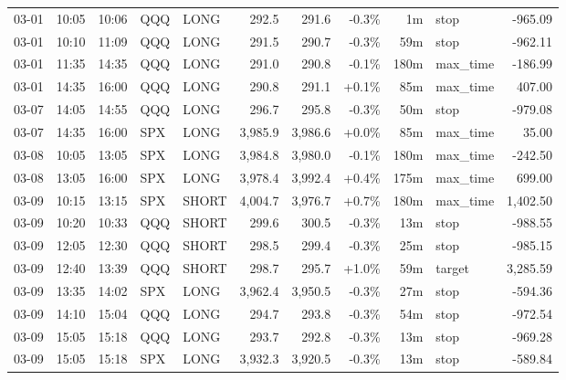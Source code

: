 \documentclass[11pt,a4paper,twoside]{article}
\begin{document}
\begin{center}
\begin{longtable}{>{\color{txtmain}}l l l l l r r r r >{\color{txtmain}}l r}
03-01 & 10:05 & 10:06 & QQQ & LONG & 292.5 & 291.6 & \textcolor{lossred}{-0.3\%} & 1m & stop & \textcolor{lossred}{-965.09} \\
03-01 & 10:10 & 11:09 & QQQ & LONG & 291.5 & 290.7 & \textcolor{lossred}{-0.3\%} & 59m & stop & \textcolor{lossred}{-962.11} \\
03-01 & 11:35 & 14:35 & QQQ & LONG & 291.0 & 290.8 & \textcolor{lossred}{-0.1\%} & 180m & max\_time & \textcolor{lossred}{-186.99} \\
03-01 & 14:35 & 16:00 & QQQ & LONG & 290.8 & 291.1 & \textcolor{wingreen}{+0.1\%} & 85m & max\_time & \textcolor{wingreen}{407.00} \\
03-07 & 14:05 & 14:55 & QQQ & LONG & 296.7 & 295.8 & \textcolor{lossred}{-0.3\%} & 50m & stop & \textcolor{lossred}{-979.08} \\
03-07 & 14:35 & 16:00 & SPX & LONG & 3,985.9 & 3,986.6 & \textcolor{wingreen}{+0.0\%} & 85m & max\_time & \textcolor{wingreen}{35.00} \\
03-08 & 10:05 & 13:05 & SPX & LONG & 3,984.8 & 3,980.0 & \textcolor{lossred}{-0.1\%} & 180m & max\_time & \textcolor{lossred}{-242.50} \\
03-08 & 13:05 & 16:00 & SPX & LONG & 3,978.4 & 3,992.4 & \textcolor{wingreen}{+0.4\%} & 175m & max\_time & \textcolor{wingreen}{699.00} \\
03-09 & 10:15 & 13:15 & SPX & SHORT & 4,004.7 & 3,976.7 & \textcolor{wingreen}{+0.7\%} & 180m & max\_time & \textcolor{wingreen}{1,402.50} \\
03-09 & 10:20 & 10:33 & QQQ & SHORT & 299.6 & 300.5 & \textcolor{lossred}{-0.3\%} & 13m & stop & \textcolor{lossred}{-988.55} \\
03-09 & 12:05 & 12:30 & QQQ & SHORT & 298.5 & 299.4 & \textcolor{lossred}{-0.3\%} & 25m & stop & \textcolor{lossred}{-985.15} \\
03-09 & 12:40 & 13:39 & QQQ & SHORT & 298.7 & 295.7 & \textcolor{wingreen}{+1.0\%} & 59m & target & \textcolor{wingreen}{3,285.59} \\
03-09 & 13:35 & 14:02 & SPX & LONG & 3,962.4 & 3,950.5 & \textcolor{lossred}{-0.3\%} & 27m & stop & \textcolor{lossred}{-594.36} \\
03-09 & 14:10 & 15:04 & QQQ & LONG & 294.7 & 293.8 & \textcolor{lossred}{-0.3\%} & 54m & stop & \textcolor{lossred}{-972.54} \\
03-09 & 15:05 & 15:18 & QQQ & LONG & 293.7 & 292.8 & \textcolor{lossred}{-0.3\%} & 13m & stop & \textcolor{lossred}{-969.28} \\
03-09 & 15:05 & 15:18 & SPX & LONG & 3,932.3 & 3,920.5 & \textcolor{lossred}{-0.3\%} & 13m & stop & \textcolor{lossred}{-589.84} \\

\end{longtable}
\end{center}
\end{document}
